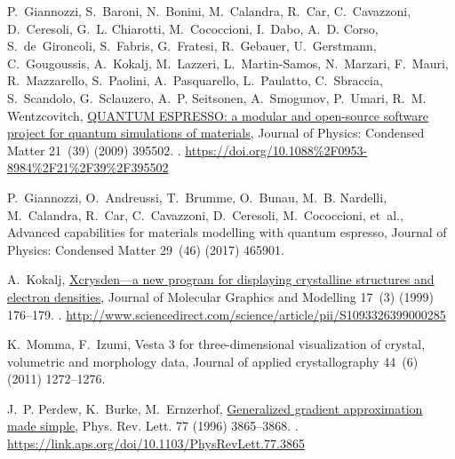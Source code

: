\documentclass[5p,twocolumn]{elsarticle}
\begin{document}
\begin{thebibliography}{10}
	P.~Giannozzi, S.~Baroni, N.~Bonini, M.~Calandra, R.~Car, C.~Cavazzoni,
	D.~Ceresoli, G.~L. Chiarotti, M.~Cococcioni, I.~Dabo, A.~D. Corso,
	S.~de~Gironcoli, S.~Fabris, G.~Fratesi, R.~Gebauer, U.~Gerstmann,
	C.~Gougoussis, A.~Kokalj, M.~Lazzeri, L.~Martin-Samos, N.~Marzari, F.~Mauri,
	R.~Mazzarello, S.~Paolini, A.~Pasquarello, L.~Paulatto, C.~Sbraccia,
	S.~Scandolo, G.~Sclauzero, A.~P. Seitsonen, A.~Smogunov, P.~Umari, R.~M.
	Wentzcovitch,
	\href{https://doi.org/10.1088%2F0953-8984%2F21%2F39%2F395502}{{QUANTUM}
		{ESPRESSO}: a modular and open-source software project for quantum
		simulations of materials}, Journal of Physics: Condensed Matter 21~(39)
	(2009) 395502.
	\newblock \href {https://doi.org/10.1088/0953-8984/21/39/395502}
	{}.
	\newline\urlprefix\url{https://doi.org/10.1088%2F0953-8984%2F21%2F39%2F395502}
		
		P.~Giannozzi, O.~Andreussi, T.~Brumme, O.~Bunau, M.~B. Nardelli, M.~Calandra,
		R.~Car, C.~Cavazzoni, D.~Ceresoli, M.~Cococcioni, et~al., Advanced
		capabilities for materials modelling with quantum espresso, Journal of
		Physics: Condensed Matter 29~(46) (2017) 465901.
		
		A.~Kokalj,
		\href{http://www.sciencedirect.com/science/article/pii/S1093326399000285}{Xcrysden---a
			new program for displaying crystalline structures and electron densities},
		Journal of Molecular Graphics and Modelling 17~(3) (1999) 176--179.
		\newblock \href {https://doi.org/10.1016/S1093-3263(99)00028-5}
		{}.
		\newline\urlprefix\url{http://www.sciencedirect.com/science/article/pii/S1093326399000285}
		
		K.~Momma, F.~Izumi, Vesta 3 for three-dimensional visualization of crystal,
		volumetric and morphology data, Journal of applied crystallography 44~(6)
		(2011) 1272--1276.
		
		J.~P. Perdew, K.~Burke, M.~Ernzerhof,
		\href{https://link.aps.org/doi/10.1103/PhysRevLett.77.3865}{Generalized
			gradient approximation made simple}, Phys. Rev. Lett. 77 (1996) 3865--3868.
		\newblock \href {https://doi.org/10.1103/PhysRevLett.77.3865}
		{}.
		\newline\urlprefix\url{https://link.aps.org/doi/10.1103/PhysRevLett.77.3865}
		

\end{thebibliography}
\end{document}
